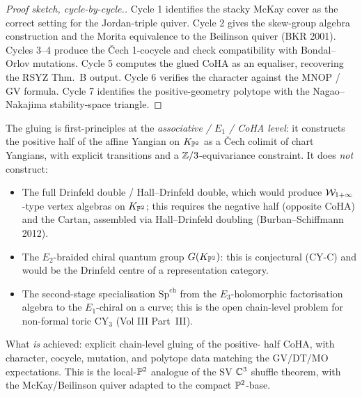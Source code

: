 \begin{proof}[Proof sketch, cycle-by-cycle.]
Cycle 1 identifies the stacky McKay cover as the correct setting for
the Jordan-triple quiver. Cycle 2 gives the skew-group algebra
construction and the Morita equivalence to the Beilinson quiver (BKR
2001). Cycles 3--4 produce the \v Cech 1-cocycle and check compatibility
with Bondal--Orlov mutations. Cycle 5 computes the glued CoHA as an
equaliser, recovering the RSYZ Thm.\ B output. Cycle 6 verifies the
character against the MNOP / GV formula. Cycle 7 identifies the
positive-geometry polytope with the Nagao--Nakajima stability-space
triangle.
\end{proof}

\begin{remark}
\label{rmk:local-P2-scope}
The gluing is first-principles at the \emph{associative / $E_1$ / CoHA
level}: it constructs the positive half of the affine Yangian on
$K_{\mathbb{P}^2}$ as a \v Cech colimit of chart Yangians, with explicit
transitions and a $\mathbb{Z}/3$-equivariance constraint. It does \emph{not}
construct:
\begin{itemize}
\item The full Drinfeld double / Hall--Drinfeld double, which would
produce $\mathcal{W}_{1+\infty}$-type vertex algebras on $K_{\mathbb{P}^2}$; this requires
the negative half (opposite CoHA) and the Cartan, assembled via
Hall--Drinfeld doubling (Burban--Schiffmann 2012).
\item The $E_2$-braided chiral quantum group
$G(K_{\mathbb{P}^2})$: this is conjectural (CY-C) and would be the Drinfeld
centre of a representation category.
\item The second-stage specialisation $\mathrm{Sp}^{\mathrm{ch}}$ from
the $E_3$-holomorphic factorisation algebra to the $E_1$-chiral on a
curve; this is the open chain-level problem for non-formal toric
CY$_3$ (Vol III Part~III).
\end{itemize}
What \emph{is} achieved: explicit chain-level gluing of the positive-
half CoHA, with character, cocycle, mutation, and polytope data matching
the GV/DT/MO expectations. This is the local-$\mathbb{P}^2$ analogue of the
SV $\mathbb{C}^3$ shuffle theorem, with the McKay/Beilinson quiver adapted to
the compact $\mathbb{P}^2$-base.
\end{remark}


